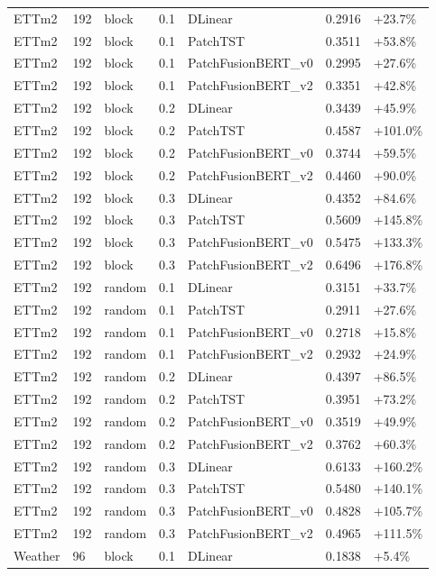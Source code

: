 \begin{tabular}{lllrlll}
ETTm2 & 192 & block & 0.1 & DLinear & 0.2916 & +23.7\% \\
ETTm2 & 192 & block & 0.1 & PatchTST & 0.3511 & +53.8\% \\
ETTm2 & 192 & block & 0.1 & PatchFusionBERT_v0 & 0.2995 & +27.6\% \\
ETTm2 & 192 & block & 0.1 & PatchFusionBERT_v2 & 0.3351 & +42.8\% \\
ETTm2 & 192 & block & 0.2 & DLinear & 0.3439 & +45.9\% \\
ETTm2 & 192 & block & 0.2 & PatchTST & 0.4587 & +101.0\% \\
ETTm2 & 192 & block & 0.2 & PatchFusionBERT_v0 & 0.3744 & +59.5\% \\
ETTm2 & 192 & block & 0.2 & PatchFusionBERT_v2 & 0.4460 & +90.0\% \\
ETTm2 & 192 & block & 0.3 & DLinear & 0.4352 & +84.6\% \\
ETTm2 & 192 & block & 0.3 & PatchTST & 0.5609 & +145.8\% \\
ETTm2 & 192 & block & 0.3 & PatchFusionBERT_v0 & 0.5475 & +133.3\% \\
ETTm2 & 192 & block & 0.3 & PatchFusionBERT_v2 & 0.6496 & +176.8\% \\
ETTm2 & 192 & random & 0.1 & DLinear & 0.3151 & +33.7\% \\
ETTm2 & 192 & random & 0.1 & PatchTST & 0.2911 & +27.6\% \\
ETTm2 & 192 & random & 0.1 & PatchFusionBERT_v0 & 0.2718 & +15.8\% \\
ETTm2 & 192 & random & 0.1 & PatchFusionBERT_v2 & 0.2932 & +24.9\% \\
ETTm2 & 192 & random & 0.2 & DLinear & 0.4397 & +86.5\% \\
ETTm2 & 192 & random & 0.2 & PatchTST & 0.3951 & +73.2\% \\
ETTm2 & 192 & random & 0.2 & PatchFusionBERT_v0 & 0.3519 & +49.9\% \\
ETTm2 & 192 & random & 0.2 & PatchFusionBERT_v2 & 0.3762 & +60.3\% \\
ETTm2 & 192 & random & 0.3 & DLinear & 0.6133 & +160.2\% \\
ETTm2 & 192 & random & 0.3 & PatchTST & 0.5480 & +140.1\% \\
ETTm2 & 192 & random & 0.3 & PatchFusionBERT_v0 & 0.4828 & +105.7\% \\
ETTm2 & 192 & random & 0.3 & PatchFusionBERT_v2 & 0.4965 & +111.5\% \\
Weather & 96 & block & 0.1 & DLinear & 0.1838 & +5.4\% \\

\end{tabular}

